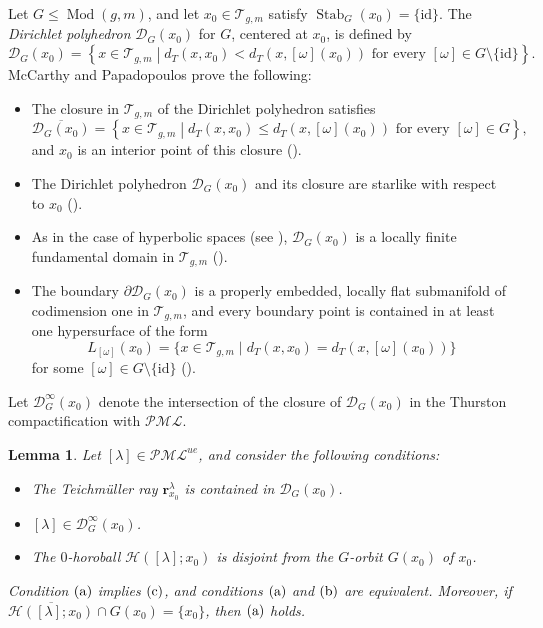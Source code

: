 \documentclass[dvipdfmx]{amsart}
\newtheorem{lemma}{Lemma}[section]
\theoremstyle{remark}
\newcommand{\teich}{\mathcal{T}}
\newcommand{\tmod}{\operatorname{Mod}}
\newcommand{\ray}{{\boldsymbol r}}
\newcommand{\pml}{\mathcal{PML}}
\newcommand{\Dirichlet}{\mathscr{D}}
\newcommand{\horos}{\mathscr{H}}
\begin{document}
Let $G\le \tmod(g,m)$, and let $x_0\in\teich_{g,m}$ satisfy $\operatorname{Stab}_G(x_0)=\{\mathrm{id}\}$. The \emph{Dirichlet polyhedron} $\Dirichlet_G(x_0)$ for $G$, centered at $x_0$, is defined by
\[
\Dirichlet_G(x_0)
=\left\{x\in\teich_{g,m}\mathrel{}\middle|\mathrel{}
d_T(x,x_0)<d_T(x,[\omega](x_0))
\text{ for every }[\omega]\in G\setminus\{\mathrm{id}\}\right\}.
\]
McCarthy and Papadopoulos prove the following:
\begin{itemize}
\item The closure in $\teich_{g,m}$ of the Dirichlet polyhedron satisfies
\[
\overline{\Dirichlet_G(x_0)}
=\left\{x\in\teich_{g,m}\mathrel{}\middle|\mathrel{}
d_T(x,x_0)\le d_T(x,[\omega](x_0))
\text{ for every }[\omega]\in G\right\},
\]
and $x_0$ is an interior point of this closure (\cite[Propositions 5.1 and 5.2]{McCarthyPapadopoulos1996}).
\item The Dirichlet polyhedron $\Dirichlet_G(x_0)$ and its closure are starlike with respect to $x_0$ (\cite[Proposition 5.3]{McCarthyPapadopoulos1996}).
\item As in the case of hyperbolic spaces (see \cite[Chapter 9]{Beardon1995}), $\Dirichlet_G(x_0)$ is a locally finite fundamental domain in $\teich_{g,m}$ (\cite[Theorem 5.9]{McCarthyPapadopoulos1996}).
\item The boundary $\partial \Dirichlet_G(x_0)$ is a properly embedded, locally flat submanifold of codimension one in $\teich_{g,m}$, and every boundary point is contained in at least one hypersurface of the form
\[
L_{[\omega]}(x_0)
=\{x\in \teich_{g,m}\mid d_T(x,x_0)=d_T(x,[\omega](x_0))\}
\]
for some $[\omega]\in G\setminus\{\mathrm{id}\}$ (\cite[Propositions 5.2 and 5.5]{McCarthyPapadopoulos1996}).
\end{itemize}
Let $\Dirichlet^\infty_G(x_0)$ denote the intersection of the closure of $\Dirichlet_G(x_0)$ in the Thurston compactification with $\pml$.

\begin{lemma}
\label{lem:Dirichlet_geodesic_horoball}
Let $[\lambda]\in\pml^{ue}$, and consider the following conditions:
\begin{itemize}
\item[(a)] The Teichm\"uller ray $\ray^{\lambda}_{x_0}$ is contained in $\Dirichlet_G(x_0)$.
\item[(b)] $[\lambda]\in \Dirichlet^\infty_G(x_0)$.
\item[(c)] The $0$-horoball $\horos([\lambda];x_0)$ is disjoint from the $G$-orbit $G(x_0)$ of $x_0$.
\end{itemize}
Condition ${\rm (a)}$ implies ${\rm (c)}$, and conditions ${\rm (a)}$ and ${\rm (b)}$ are equivalent. Moreover, if $\overline{\horos([\lambda];x_0)}\cap G(x_0)=\{x_0\}$, then ${\rm (a)}$ holds.
\end{lemma}
\end{document}
